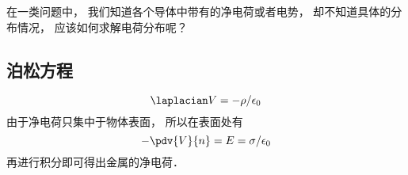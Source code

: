 
\begin{issues}
\issueDraft
\end{issues}

在一类问题中， 我们知道各个导体中带有的净电荷或者电势， 却不知道具体的分布情况， 应该如何求解电荷分布呢？

\subsection{泊松方程}
\begin{equation}
\laplacian V = -\rho/\epsilon_0
\end{equation}
由于净电荷只集中于物体表面， 所以在表面处有
\begin{equation}
-\pdv{V}{n} = E = \sigma/\epsilon_0
\end{equation}
再进行积分即可得出金属的净电荷．
